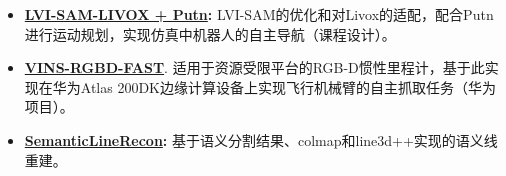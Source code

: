 \documentclass[11pt,a4paper,sans]{moderncv}        %
\begin{document}
\begin{itemize}

    


\item \textbf{\href{https://github.com/jianhengLiu/LVI-SAM-LIVOX}{LVI-SAM-LIVOX + Putn}:} LVI-SAM的优化和对Livox的适配，配合Putn进行运动规划，实现仿真中机器人的自主导航（课程设计）。


\item \textbf{\href{https://github.com/jianhengLiu/VINS-RGBD-FAST}{VINS-RGBD-FAST}}.
适用于资源受限平台的RGB-D惯性里程计，基于此实现在华为Atlas 200DK边缘计算设备上实现飞行机械臂的自主抓取任务（华为项目）。



\item \textbf{\href{https://github.com/jianhengLiu/SV-SLAM}{SemanticLineRecon}:} 基于语义分割结果、colmap和line3d++实现的语义线重建。






\end{itemize}
\end{document}
